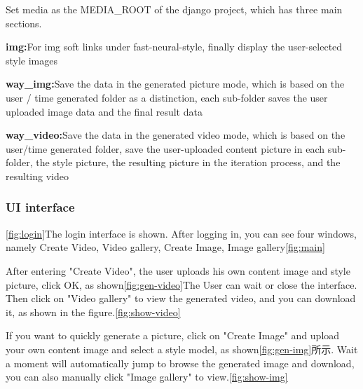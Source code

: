 Set media as the MEDIA\_ROOT of the django project, which has three main sections.
\begin{description}
  \item{\textbf{img:}}For img soft links under fast-neural-style, finally display the user-selected style images
  \item{\textbf{way\_img:}}Save the data in the generated picture mode, which is based on the user / time generated folder as a distinction, each sub-folder saves the user uploaded image data and the final result data
  \item{\textbf{way\_video:}}Save the data in the generated video mode, which is based on the user/time generated folder, save the user-uploaded content picture in each sub-folder, the style picture, the resulting picture in the iteration process, and the resulting video
\end{description}

\subsubsection{UI interface}
\ref{fig:login}The login interface is shown. After logging in, you can see four windows, namely Create Video, Video gallery, Create Image, Image gallery\ref{fig:main}

After entering "Create Video", the user uploads his own content image and style picture, click OK, as shown\ref{fig:gen-video}The User can wait or close the interface.
Then click on "Video gallery" to view the generated video, and you can download it, as shown in the figure.\ref{fig:show-video}

If you want to quickly generate a picture, click on "Create Image" and upload your own content image and select a style model, as shown\ref{fig:gen-img}所示.
Wait a moment will automatically jump to browse the generated image and download, you can also manually click "Image gallery" to view.\ref{fig:show-img}
